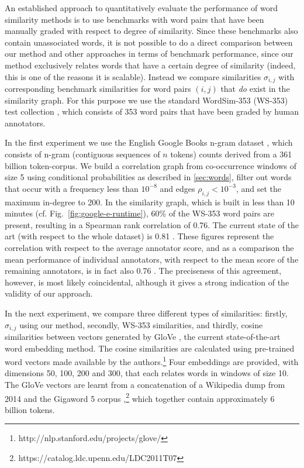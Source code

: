 \documentclass{kais}
\newcommand{\rn}[1]{\rho_{#1}}
\newcommand{\sy}[1]{\sigma_{#1}}
\begin{document}
An established approach to quantitatively evaluate the performance of word similarity methods is to use benchmarks
with word pairs that have been manually graded with respect to degree of similarity. Since these
benchmarks also contain unassociated words, it is not possible to do a direct comparison between our
method and other approaches in terms of benchmark performance, since our method exclusively relates words that 
have a certain degree of similarity (indeed, this is one of the reasons it is scalable). Instead we compare similarities 
$\sy{i,j}$ with corresponding benchmark similarities for word pairs $(i, j)$ that \emph{do} exist in the similarity graph.
For this purpose we use the standard WordSim-353 (WS-353) test collection \cite{Finkelstein01}, 
which consists of 353 word pairs that have been graded by human annotators. 

In the first experiment we use the English Google Books n-gram dataset \cite{Michel10,Lin12}, which consists of n-gram 
(contiguous sequences of $n$ tokens) counts derived from a 361 billion token-corpus.
We build a correlation graph from co-occurrence windows of size 5 using conditional probabilities as described in \ref{sec:words}, filter
out words that occur with a frequency less than $10^{-8}$ and edges $\rn{i,j} < 10^{-3}$, and
set the maximum in-degree to 200. In the similarity graph, which is built in less than 10 minutes (cf. Fig.\ \ref{fig:google-e-runtime}),
60\% of the WS-353 word pairs are present, resulting in a Spearman rank correlation of 0.76. The current state of the
art (with respect to the whole dataset) is 0.81 \cite{Halawi12,Yih12}.
These figures represent the correlation with respect to the average annotator score, and as a comparison the mean performance
of individual annotators, with respect to the mean score of the remaining annotators, is in fact also 0.76 \cite{Hill14}.
The preciseness of this agreement, however, is most likely coincidental, although it gives a strong indication of the 
validity of our approach.

In the next experiment, we compare three different types of similarities: firstly, $\sy{i, j}$ using our method, secondly, WS-353 similarities, and thirdly,
cosine similarities between vectors generated by GloVe \cite{Pennington2014}, the current state-of-the-art word embedding method.
The cosine similarities are calculated using pre-trained word vectors made available by the authors.\footnote{http://nlp.stanford.edu/projects/glove/}
Four embeddings are provided, with dimensions 50, 100, 200 and 300, that each relates words in windows of size 10. 
The GloVe vectors are learnt from a concatenation of a Wikipedia dump from 2014 and the Gigaword 5 corpus 
\cite{Graff03},\footnote{https://catalog.ldc.upenn.edu/LDC2011T07} which together contain approximately 6 billion tokens.
\end{document}
